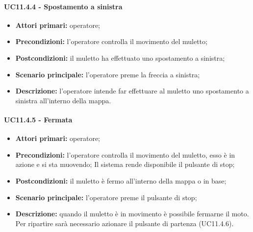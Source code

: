 \paragraph{UC11.4.4 - Spostamento a sinistra}
\begin{itemize}
	\item 	\textbf{Attori primari:} operatore;
	\item 	\textbf{Precondizioni:} l’operatore controlla il movimento del muletto;
	\item 	\textbf{Postcondizioni:} il muletto ha effettuato uno spostamento a sinistra; 
	\item 	\textbf{Scenario principale:} l’operatore preme la freccia a sinistra;
	\item 	\textbf{Descrizione:} l’operatore intende far effettuare al muletto uno spostamento a sinistra all’interno della mappa.
\end{itemize}


\paragraph{UC11.4.5 - Fermata}
\begin{itemize}
	\item 	\textbf{Attori primari:} operatore;
	\item 	\textbf{Precondizioni:} l’operatore controlla il movimento del muletto, esso è in azione e si sta muovendo; Il sistema rende disponibile il pulsante di stop;
	\item 	\textbf{Postcondizioni:} il muletto è fermo all’interno della mappa o in base;
	\item 	\textbf{Scenario principale:} l’operatore preme il pulsante di stop;
	\item 	\textbf{Descrizione:} quando il muletto è in movimento è possibile fermarne il moto. Per ripartire sarà necessario azionare il pulsante di partenza (UC11.4.6).
\end{itemize}


